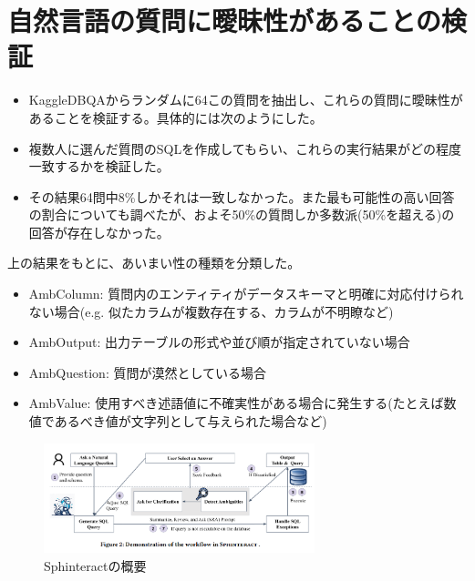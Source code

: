 \documentclass[dvipdfmx,uplatex]{jsarticle}
\theoremstyle{remark}
\newenvironment{simplebox}{
    \begin{tcolorbox}[
        fonttitle=\bfseries,
    ]
}{
    \end{tcolorbox}
}
\begin{document}
\section{自然言語の質問に曖昧性があることの検証}
\begin{simplebox}
\begin{itemize}
    \item KaggleDBQAからランダムに64この質問を抽出し、これらの質問に曖昧性があることを検証する。具体的には次のようにした。
    \item 複数人に選んだ質問のSQLを作成してもらい、これらの実行結果がどの程度一致するかを検証した。
    \item その結果64問中8\%しかそれは一致しなかった。また最も可能性の高い回答の割合についても調べたが、およそ50\%の質問しか多数派(50\%を超える)の回答が存在しなかった。
\end{itemize}
上の結果をもとに、あいまい性の種類を分類した。
\begin{itemize}
    \item AmbColumn: 質問内のエンティティがデータスキーマと明確に対応付けられない場合(e.g. 似たカラムが複数存在する、カラムが不明瞭など)
    \item AmbOutput: 出力テーブルの形式や並び順が指定されていない場合
    \item AmbQuestion: 質問が漠然としている場合
    \item AmbValue: 使用すべき述語値に不確実性がある場合に発生する(たとえば数値であるべき値が文字列として与えられた場合など)
\end{itemize}
\end{simplebox}

\begin{figure}
    \centering
    \includegraphics[width=0.7\textwidth]{img/sphinteract/overview.png}
    \caption{Sphinteractの概要}
    \label{fig:overview}
\end{figure}
\end{document}
